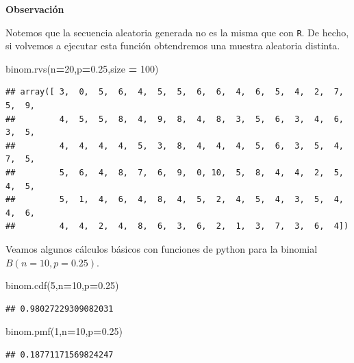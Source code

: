 \documentclass[]{book}
\newenvironment{Shaded}{\begin{snugshade}}{\end{snugshade}}
\newcommand{\DecValTok}[1]{\textcolor[rgb]{0.00,0.00,0.81}{#1}}
\newcommand{\FloatTok}[1]{\textcolor[rgb]{0.00,0.00,0.81}{#1}}
\newcommand{\NormalTok}[1]{#1}
\newcommand{\OperatorTok}[1]{\textcolor[rgb]{0.81,0.36,0.00}{\textbf{#1}}}
\begin{document}
 \textbf{Observación}

Notemos que la secuencia aleatoria generada no es la misma que con \texttt{R}. De hecho, si volvemos a ejecutar esta función obtendremos una muestra aleatoria distinta.

\begin{Shaded}
\begin{Highlighting}[]
\NormalTok{binom.rvs(n}\OperatorTok{=}\DecValTok{20}\NormalTok{,p}\OperatorTok{=}\FloatTok{0.25}\NormalTok{,size }\OperatorTok{=} \DecValTok{100}\NormalTok{)}
\end{Highlighting}
\end{Shaded}

\begin{verbatim}
## array([ 3,  0,  5,  6,  4,  5,  5,  6,  6,  4,  6,  5,  4,  2,  7,  5,  9,
##         4,  5,  5,  8,  4,  9,  8,  4,  8,  3,  5,  6,  3,  4,  6,  3,  5,
##         4,  4,  4,  4,  5,  3,  8,  4,  4,  4,  5,  6,  3,  5,  4,  7,  5,
##         5,  6,  4,  8,  7,  6,  9,  0, 10,  5,  8,  4,  4,  2,  5,  4,  5,
##         5,  1,  4,  6,  4,  8,  4,  5,  2,  4,  5,  4,  3,  5,  4,  4,  6,
##         4,  4,  2,  4,  8,  6,  3,  6,  2,  1,  3,  7,  3,  6,  4])
\end{verbatim}

Veamos algunos cálculos básicos con funciones de python para la binomial \(B(n=10,p=0.25)\).

\begin{Shaded}
\begin{Highlighting}[]
\NormalTok{binom.cdf(}\DecValTok{5}\NormalTok{,n}\OperatorTok{=}\DecValTok{10}\NormalTok{,p}\OperatorTok{=}\FloatTok{0.25}\NormalTok{)}
\end{Highlighting}
\end{Shaded}

\begin{verbatim}
## 0.98027229309082031
\end{verbatim}

\begin{Shaded}
\begin{Highlighting}[]
\NormalTok{binom.pmf(}\DecValTok{1}\NormalTok{,n}\OperatorTok{=}\DecValTok{10}\NormalTok{,p}\OperatorTok{=}\FloatTok{0.25}\NormalTok{)}
\end{Highlighting}
\end{Shaded}

\begin{verbatim}
## 0.18771171569824247
\end{verbatim}
\end{document}
